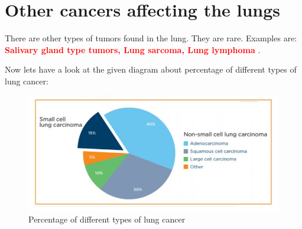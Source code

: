 \section{Other cancers affecting the lungs} 
\begin{remark}
There are other types of tumors found in the lung. They are rare. Examples are: \textcolor{red}{\textbf{Salivary gland type tumors, Lung sarcoma, Lung lymphoma }}.
\end{remark}

Now lets have a look at the given diagram about percentage \cite{kratzer2024lung} of different types of lung cancer:

\begin{figure}[h!]
    \centering
    \includegraphics[width=0.7\linewidth]{images/percentage_of_lc.jpeg}
    \caption{Percentage of different types of lung cancer}
    \label{fig:types-label}
\end{figure}
